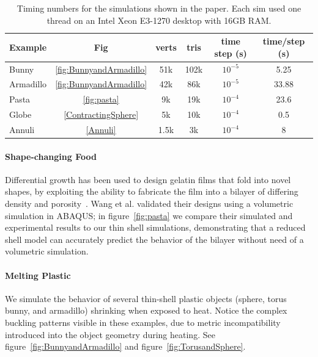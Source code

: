 \documentclass[timestamp,acmtog]{acmart}
\begin{document}
\begin{table}[htb]
\begin{tabular}{lc|cc|cc}
Example & Fig & verts & tris & time step (s) & time/step (s) \\
\hline
Bunny & \ref{fig:BunnyandArmadillo} & 51k & 102k & $10^{-5}$ & 5.25  \\
Armadillo & \ref{fig:BunnyandArmadillo} & 42k & 86k &  $10^{-5}$ & 33.88 \\
Pasta & \ref{fig:pasta} & 9k & 19k & $10^{-4}$ &  23.6 \\
Globe & \ref{ContractingSphere} & 5k & 10k & $10^{-4}$ & 0.5 \\
Annuli  & \ref{Annuli} & 1.5k & 3k & $10^{-4}$ & 8 
\end{tabular}
\caption{Timing numbers for the simulations shown in the paper. Each sim used one thread on an Intel Xeon E3-1270 desktop with 16GB RAM.}
\label{tab:timing}
\vspace*{-10pt}
\end{table}



\paragraph{Shape-changing Food} Differential growth has been used to design gelatin films that fold into novel shapes, by exploiting the ability to fabricate the film into a bilayer of differing density and porosity~\cite{Wang2017}. Wang et al. validated their designs using a volumetric simulation in ABAQUS; in figure~\ref{fig:pasta} we compare their simulated and experimental results to our thin shell simulations, demonstrating that a reduced shell model can accurately predict the behavior of the bilayer without need of a volumetric simulation.

\paragraph{Melting Plastic} We simulate the behavior of several thin-shell plastic objects (sphere, torus bunny, and armadillo) shrinking when exposed to heat. Notice the complex buckling patterns visible in these examples, due to metric incompatibility introduced into the object geometry during heating. See figure~\ref{fig:BunnyandArmadillo} and figure~\ref{fig:TorusandSphere}.
\end{document}
